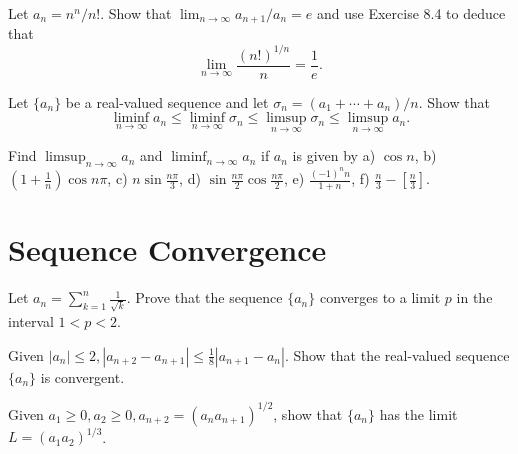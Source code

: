     \begin{problembox}
    Let \(a_n = n^n / n!\). Show that \(\lim_{n \to \infty} a_{n+1} / a_n = e\) and use Exercise 8.4 to deduce that
    \[\lim_{n \to \infty} \frac{(n!)^{1/n}}{n} = \frac{1}{e}.\]
    \end{problembox}
    
    \begin{problembox}
    Let \(\{a_n\}\) be a real-valued sequence and let \(\sigma_n = (a_1 + \cdots + a_n)/n\). Show that
    \[\liminf_{n \to \infty} a_n \leq \liminf_{n \to \infty} \sigma_n \leq \limsup_{n \to \infty} \sigma_n \leq \limsup_{n \to \infty} a_n.\]
    \end{problembox}
    
    \begin{problembox}
    Find \(\limsup_{n \to \infty} a_n\) and \(\liminf_{n \to \infty} a_n\) if \(a_n\) is given by
    a) \(\cos n\),    b) \(\left(1 + \frac{1}{n}\right) \cos n\pi\),    c) \(n \sin \frac{n\pi}{3}\), 
    d) \(\sin \frac{n\pi}{2} \cos \frac{n\pi}{2}\),    e) \(\frac{(-1)^n n}{1 + n}\),    f) \(\frac{n}{3} - \left[\frac{n}{3}\right]\).
    \end{problembox}

\section{Sequence Convergence}

\begin{problembox}
    Let \(a_n = \sum_{k=1}^n \frac{1}{\sqrt{k}}\). Prove that the sequence \(\{a_n\}\) converges to a limit \(p\) in the interval \(1 < p < 2\).
    \end{problembox}
    
    \begin{problembox}
    Given \(|a_n| \leq 2, |a_{n+2} - a_{n+1}| \leq \frac{1}{8} |a_{n+1} - a_n|\). Show that the real-valued sequence \(\{a_n\}\) is convergent.
    \end{problembox}
    
    \begin{problembox}
    Given \(a_1 \geq 0, a_2 \geq 0, a_{n+2} = (a_n a_{n+1})^{1/2}\), show that \(\{a_n\}\) has the limit \(L = (a_1 a_2)^{1/3}\).
    \end{problembox}
    
